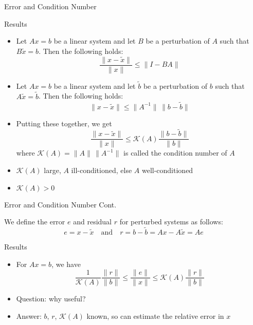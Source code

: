 \documentclass[9pt, serif]{beamer}
\newlength{\wideitemsep}
\let\olditem\item
\renewcommand{\item}{\setlength{\itemsep}{\wideitemsep}\olditem}
\newcommand{\bi}{\begin{itemize}}
\newcommand{\ei}{\end{itemize}}
\newcommand{\norm}[1]{\lVert#1\rVert}
\begin{document}
\begin{frame}{Error and Condition Number}
    \pause
    \begin{block}{Results}
        \bi
            \item Let $Ax = b$ be a linear system and let $B$ be a perturbation of
            $A$ such that $B\tilde{x} = b$. Then the following holds: $$\frac{\norm{x-\tilde{x}}}{\norm{x}} \le \norm{I-BA}$$ \pause
            \vspace{-5mm}
            \item Let $Ax = b$ be a linear system and let $\tilde{b}$ be a perturbation of
            $b$ such that $A\tilde{x} = \tilde{b}$. Then the following holds: $$\norm{x-\tilde{x}} \le \norm{A^{-1}}\,\norm{b-\tilde{b}}$$ \pause
            \vspace{-5mm}
            \item Putting these together, we get 
            $$\frac{\norm{x-\tilde{x}}}{\norm{x}} \le \mathcal{K}(A)\frac{\norm{b-\tilde{b}}}{\norm{b}}$$ where 
            $\mathcal{K}(A) = \norm{A}\,\norm{A^{-1}}$ is called the condition number of $A$ \pause
            \item $\mathcal{K}(A)$ large, $A$ ill-conditioned, else $A$ well-conditioned \pause
            \item $\mathcal{K}(A)>0$
        \ei
    \end{block}
\end{frame}


\begin{frame}{Error and Condition Number Cont.}
    \pause
    \begin{definition}
        We define the error $e$ and residual $r$ for perturbed systems as follows: 
        $$e = x - \tilde{x} \quad \text{and} \quad r = b - \tilde{b} = Ax - A\tilde{x} = Ae$$
    \end{definition} \pause
    \begin{block}{Results}
        \bi
            \item For $Ax = b$, we have 
            $$\frac{1}{\mathcal{K}(A)}\frac{\norm{r}}{\norm{b}} \le \frac{\norm{e}}{\norm{x}} \le \mathcal{K}(A)\frac{\norm{r}}{\norm{b}}$$
            \pause
            \item Question: why useful? \pause
            \item Answer: $b$, $r$, $\mathcal{K}(A)$ known, so can estimate the relative error in $x$
        \ei
    \end{block}
\end{frame}
\end{document}
